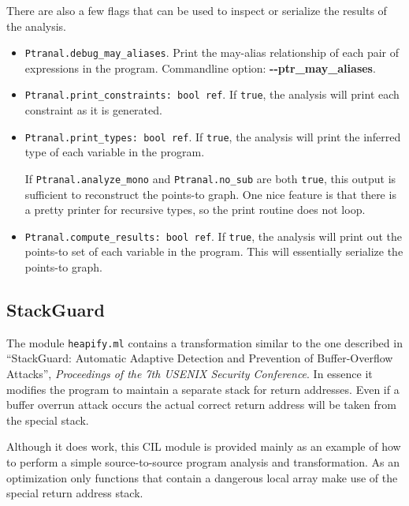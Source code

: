 \documentclass[letterpaper]{article}
\def\t#1{{\tt #1}}
\begin{document}
There are also a few flags that can be used to inspect or serialize
the results of the analysis.
\begin{itemize}
\item \t{Ptranal.debug\_may\_aliases}.
  Print the may-alias relationship of each pair of expressions in the
  program.  Commandline option: {\bf -{}-ptr\_may\_aliases}.
\item \t{Ptranal.print\_constraints: bool ref}.
  If \t{true}, the analysis will print each constraint as it is
  generated.
\item \t{Ptranal.print\_types: bool ref}.
  If \t{true}, the analysis will print the inferred type of each
  variable in the program.

  If \t{Ptranal.analyze\_mono} and \t{Ptranal.no\_sub} are both
  \t{true}, this output is sufficient to reconstruct the points-to
  graph.  One nice feature is that there is a pretty printer for
  recursive types, so the print routine does not loop.
\item \t{Ptranal.compute\_results: bool ref}.
  If \t{true}, the analysis will print out the points-to set of each
  variable in the program.  This will essentially serialize the
  points-to graph.
\end{itemize}

\subsection{StackGuard}

The module \t{heapify.ml} contains a transformation similar to the one
described in ``StackGuard: Automatic Adaptive Detection and Prevention of
Buffer-Overflow Attacks'', {\em Proceedings of the 7th USENIX Security
Conference}. In essence it modifies the program to maintain a separate
stack for return addresses. Even if a buffer overrun attack occurs the
actual correct return address will be taken from the special stack. 

Although it does work, this CIL module is provided mainly as an example of
how to perform a simple source-to-source program analysis and
transformation. As an optimization only functions that contain a dangerous
local array make use of the special return address stack. 
\end{document}
